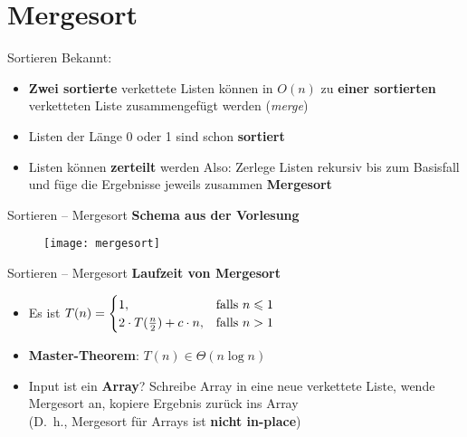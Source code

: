 \section{Mergesort}
\begin{frame}{Sortieren}
	Bekannt:   %
	\begin{itemize}
		\item \textbf{Zwei sortierte} verkettete Listen können in $O(n)$ zu \textbf{einer sortierten} verketteten Liste zusammengefügt werden (\emph{merge})
		\pause
		\item Listen der Länge 0 oder 1 sind schon \textbf{sortiert}
		\pause
		\item Listen können \textbf{zerteilt} werden
		\pause
		\implitem Also: Zerlege Listen rekursiv bis zum Basisfall und füge die Ergebnisse jeweils zusammen \impl \textbf{Mergesort}
		\begin{algorithm}[H]
		\end{algorithm}
	\end{itemize}
\end{frame}

\begin{frame}{Sortieren – Mergesort}
	\textbf{Schema aus der Vorlesung}
	\begin{figure}[htp]
		\centering
		\texttt{[image: mergesort]}
	\end{figure}
\end{frame}


\begin{frame}{Sortieren – Mergesort}
	\textbf{Laufzeit von Mergesort}
	\pause
	\begin{itemize}
		\item Es ist $T(n) = \begin{cases}
			1, & \text{falls } n \leq 1 \\
			2 \cdot T(\fract n/2 ) + c \cdot n, & \text{falls } n > 1
		\end{cases}$
		\pause
		\item \textbf{Master-Theorem}: \quad $T(n) \in \Theta(n \log n)$
		\pause
		\item Input ist ein \textbf{Array}? \impl  Schreibe Array in eine neue verkettete Liste, wende Mergesort an, kopiere Ergebnis zurück ins Array \\
		(\impl D.~h., Mergesort für Arrays ist \textbf{nicht in-place})
	\end{itemize}
\end{frame}

